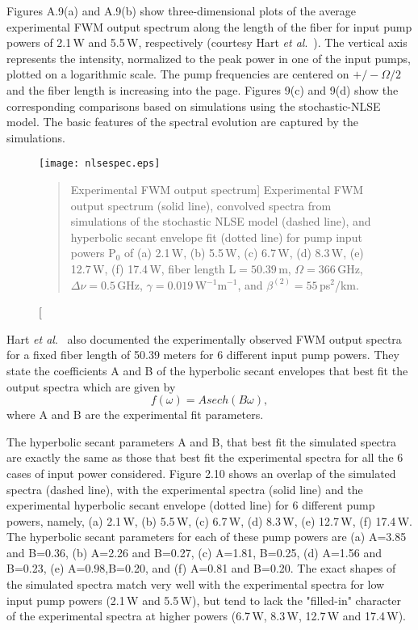 Figures A.9(a) and A.9(b) show three-dimensional plots of the average experimental
FWM output spectrum along the length of the fiber for input pump powers of 2.1\,W and 5.5\,W,
 respectively (courtesy Hart {\it et al}.\ \cite{hart1}). The vertical
axis represents the intensity, normalized to the peak power in one of the
input pumps, plotted on a logarithmic scale. The pump frequencies are centered
on $+/-\Omega/2$ and the fiber length is increasing into the page. Figures
9(c) and 9(d) show the corresponding comparisons based on simulations using
the stochastic-NLSE model. The basic features of the spectral evolution are
captured by the simulations.

\begin{figure}
\begin{center}
\texttt{[image: nlsespec.eps]}
\end{center}
\renewcommand{\baselinestretch}{1}
\small\normalsize
\begin{quote}
\caption
[Experimental FWM output spectrum]
{Experimental FWM output spectrum (solid line), convolved spectra from simulations of the stochastic NLSE model (dashed line), and hyperbolic secant envelope fit (dotted line) for pump input powers P$_0$ of (a) 2.1\,W, (b) 5.5\,W, (c) 6.7\,W, (d) 8.3\,W, (e) 12.7\,W, (f) 17.4\,W, fiber length L$= 50.39$\,m, $\Omega = 366$\,GHz, $\Delta\nu = 0.5$\,GHz, $\gamma = 0.019$\,W$^{-1}$m$^{-1}$, and $\beta^{(2)} = 55$\,ps$^2$/km.}
\label{figA.10}
\end{quote}
\end{figure}
\renewcommand{\baselinestretch}{2}
\small\normalsize

Hart {\it et al}.\ \cite{hart1} also documented the experimentally observed FWM
output spectra for a fixed fiber length of 50.39 meters for 6 different input
pump powers. They state the coefficients A and B of the hyperbolic secant
envelopes that best fit the output spectra which are given by
\begin{equation}
f(\omega) = Asech(B\omega) ,
\end{equation}
where A and B are the experimental fit parameters.

The hyperbolic secant parameters A and B, that best fit the simulated spectra
are exactly the same as those that best fit the experimental spectra
\cite{hart1} for all the 6 cases of input power considered. Figure 2.10 shows an
overlap of the simulated spectra (dashed line), with the experimental spectra
(solid line) and the experimental hyperbolic secant envelope (dotted line) for
6 different pump powers, namely, (a) 2.1\,W, (b) 5.5\,W, (c) 6.7\,W, (d) 8.3\,W, (e)
12.7\,W, (f) 17.4\,W. The hyperbolic secant parameters for each of these pump
powers are (a) A=3.85 and B=0.36, (b) A=2.26 and B=0.27, (c) A=1.81, B=0.25,
(d) A=1.56 and B=0.23, (e) A=0.98,B=0.20, and (f) A=0.81 and B=0.20. The exact
shapes of the simulated spectra match very well with the experimental spectra
for low input pump powers (2.1\,W and 5.5\,W), but tend to lack the "filled-in"
character of the experimental spectra at higher powers (6.7\,W, 8.3\,W, 12.7\,W and
17.4\,W).

